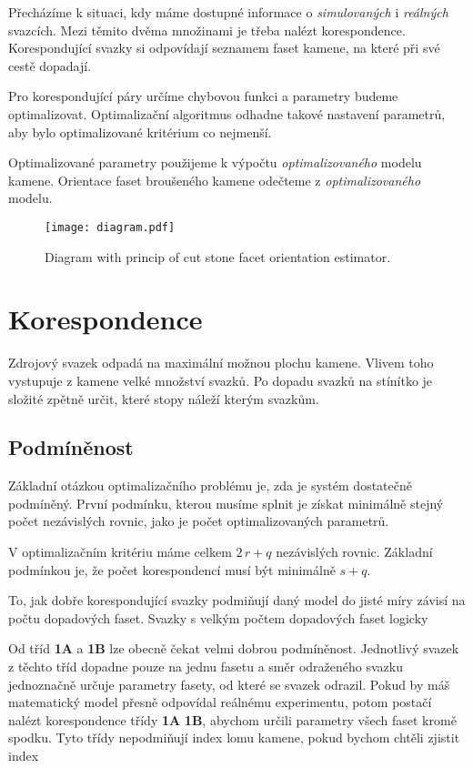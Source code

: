 Přecházíme k situaci, kdy máme dostupné informace o \textit{simulovaných} i \textit{reálných} svazcích. Mezi těmito dvěma množinami je třeba nalézt korespondence. Korespondující svazky si odpovídají seznamem faset kamene, na které při své cestě dopadají.  

Pro korespondující páry určíme chybovou funkci a parametry budeme optimalizovat. Optimalizační algoritmus odhadne takové nastavení parametrů, aby bylo optimalizované kritérium co nejmenší. 

Optimalizované parametry použijeme k výpočtu \textit{optimalizovaného} modelu kamene. Orientace faset broušeného kamene odečteme z \textit{optimalizovaného} modelu.   

\begin{figure} [h!]
\centering
\texttt{[image: diagram.pdf]}
\caption{Diagram with princip of cut stone facet orientation estimator.}
\label{fig:diagram}
\end{figure}

\clearpage

\section{Korespondence}

Zdrojový svazek odpadá na maximální možnou plochu kamene. Vlivem toho vystupuje z kamene velké množství svazků. Po dopadu svazků na stínítko je složité zpětně určit, které stopy náleží kterým svazkům.

\subsection{Podmíněnost}
Základní otázkou optimalizačního problému je, zda je systém dostatečně podmíněný. První podmínku, kterou musíme splnit je získat minimálně stejný počet nezávislých rovnic, jako je počet optimalizovaných parametrů. 

V optimalizačním kritériu máme celkem  $2\,r + q$ nezávislých rovnic. Základní podmínkou je, že počet korespondencí musí být minimálně $ s+q $.

To, jak dobře korespondující svazky podmiňují daný model do jisté míry závisí na počtu dopadových faset. Svazky s velkým počtem dopadových faset logicky 



Od tříd \textbf{1A} a \textbf{1B} lze obecně čekat velmi dobrou podmíněnost. Jednotlivý svazek z těchto tříd dopadne pouze na jednu fasetu a směr odraženého svazku jednoznačně určuje parametry fasety, od které se svazek odrazil. Pokud by máš matematický model přesně odpovídal reálnému experimentu, potom postačí nalézt korespondence třídy \textbf{1A} \textbf{1B}, abychom určili parametry všech faset kromě spodku. Tyto třídy nepodmiňují index lomu kamene, pokud bychom chtěli zjistit index
 
